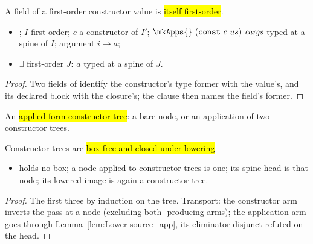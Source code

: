 \begin{proposition}
\label{prop:fOFields_of_asks}
\leanok
{}
 A field of a first-order constructor value is \hl{itself first-order}.
\begin{itemize}
\item {} ; $I$ first-order; $c$ a constructor of $I'$;
$\mkApps{}\ (\mathtt{const}\ c\ us)\ \mathit{cargs}$ typed at a spine of $I$; argument $i\to a$;
\item {} $\exists$ first-order $J$: $a$ typed at a spine of $J$.
\end{itemize}
\end{proposition}
\begin{proof}
\leanok
{}
 Two fields of  identify the constructor's type former with the value's,
and its declared block with the closure's; the  clause then names the field's former.
\end{proof}

\begin{definition}
\label{def:FOSpine}
\leanok
{}
 An \hl{applied-form constructor tree}: a bare  node, or an application
of two constructor trees.
\end{definition}

\begin{lemma}
\label{lem:FOSpine-lower}
\leanok
{}
 Constructor trees are \hl{box-free and closed under lowering}.
\begin{itemize}
\item holds no box; a  node applied to constructor trees is one; its spine head is that
node; its lowered image is again a constructor tree.
\end{itemize}
\end{lemma}
\begin{proof}
\leanok
{}
 The first three by induction on the tree. Transport: the constructor arm inverts the pass at
a  node (excluding both -producing arms); the application arm goes through
Lemma~\ref{lem:Lower-source_app}, its eliminator disjunct refuted on the head.
\end{proof}

